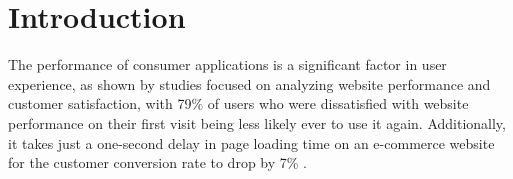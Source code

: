 
% 

\chapter{Introduction}
\label{intro}



The performance of consumer applications is a significant factor in user experience, as shown by studies focused on analyzing website performance and customer satisfaction, with 79\% of users who were dissatisfied with website performance on their first visit being less likely ever to use it again. Additionally, it takes just a one-second delay in page loading time on an e-commerce website for the customer conversion rate to drop by 7\% 
\cite{performance-ux}.

